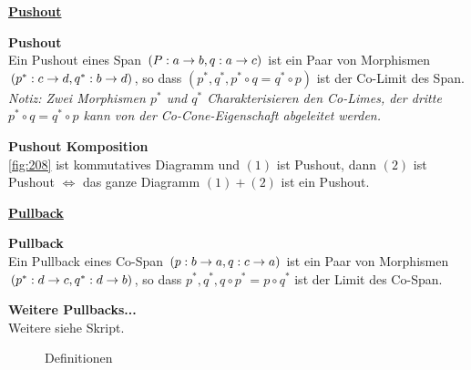 \begin{multicols}{2}

\textbf{\underline{Pushout}} 

\textbf{ Pushout} \\
Ein Pushout eines Span $(P: a \rightarrow b, q: a \rightarrow c)$ ist ein Paar von Morphismen $(p^*: c \rightarrow d, q^*: b \rightarrow d)$, so dass $(p^*, q^*, p^* \circ q = q^* \circ p)$ ist der Co-Limit des Span. \\
\emph{Notiz: Zwei Morphismen $p^*$ und $q^*$ Charakterisieren den Co-Limes, der dritte $p^* \circ q = q^* \circ p$ kann von der Co-Cone-Eigenschaft abgeleitet werden.}

\textbf{ Pushout Komposition} \\
\ref{fig:208} ist kommutatives Diagramm und $(1)$ ist Pushout, dann $(2)$ ist Pushout $\Leftrightarrow$ das ganze Diagramm $(1)+(2)$ ist ein Pushout.




\columnbreak

\textbf{\underline{Pullback}} 

\textbf{ Pullback} \\
Ein Pullback eines Co-Span $(p: b \rightarrow a, q: c \rightarrow a)$ ist ein Paar von Morphismen $(p^*: d \rightarrow c, q^*: d \rightarrow b)$, so dass $p^*,q^*, q \circ p^* = p \circ q^*$ ist der Limit des Co-Span.

\textbf{Weitere Pullbacks...} \\
Weitere siehe Skript.

\end{multicols}

\begin{figure}[h]
\centering
{} \qquad \qquad \qquad
{}
\caption{Definitionen}
\end{figure}


